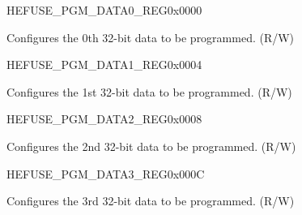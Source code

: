 \begin{register}{H}{EFUSE\_PGM\_DATA0\_REG}{0x0000}\label{regdesc:EFUSEPGMDATA0REG}
%
\regnewline%
\begin{regdesc}\begin{reglist}
\label{fielddesc:EFUSEPGMDATA0}\item [EFUSE\_PGM\_DATA\_0] Configures the 0th 32-bit data to be programmed. (R/W)
\end{reglist}\end{regdesc}
\end{register}


\begin{register}{H}{EFUSE\_PGM\_DATA1\_REG}{0x0004}\label{regdesc:EFUSEPGMDATA1REG}
%
\regnewline%
\begin{regdesc}\begin{reglist}
\label{fielddesc:EFUSEPGMDATA1}\item [EFUSE\_PGM\_DATA\_1] Configures the 1st 32-bit data to be programmed. (R/W)
\end{reglist}\end{regdesc}
\end{register}


\begin{register}{H}{EFUSE\_PGM\_DATA2\_REG}{0x0008}\label{regdesc:EFUSEPGMDATA2REG}
%
\regnewline%
\begin{regdesc}\begin{reglist}
\label{fielddesc:EFUSEPGMDATA2}\item [EFUSE\_PGM\_DATA\_2] Configures the 2nd 32-bit data to be programmed. (R/W)
\end{reglist}\end{regdesc}
\end{register}


\begin{register}{H}{EFUSE\_PGM\_DATA3\_REG}{0x000C}\label{regdesc:EFUSEPGMDATA3REG}
%
\regnewline%
\begin{regdesc}\begin{reglist}
\label{fielddesc:EFUSEPGMDATA3}\item [EFUSE\_PGM\_DATA\_3] Configures the 3rd 32-bit data to be programmed. (R/W)
\end{reglist}\end{regdesc}
\end{register}


